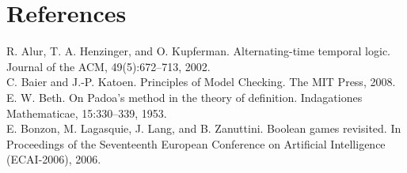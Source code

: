 \documentclass[14pt, a4paper]{article}
\begin{document}
			
			\section{References}
R. Alur, T. A. Henzinger, and O. Kupferman. Alternating-time
temporal logic. Journal of the ACM, 49(5):672–713, 2002.\\
C. Baier and J.-P. Katoen. Principles of Model Checking. The
MIT Press, 2008.\\
E. W. Beth. On Padoa’s method in the theory of definition.
Indagationes Mathematicae, 15:330–339, 1953.\\
E. Bonzon, M. Lagasquie, J. Lang, and B. Zanuttini. Boolean
games revisited. In Proceedings of the Seventeenth European
Conference on Artificial Intelligence (ECAI-2006), 2006.\\
				
	

	
\end{document}
